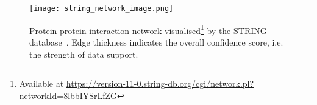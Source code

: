 \begin{figure}
    \texttt{[image: string\_network\_image.png]}
    \caption[Protein-protein interaction network visualised by the STRING database~\cite{Szklarczyk2019}.
    Edge thickness indicates the overall confidence score, i.e. the strength of data support.]%
    {Protein-protein interaction network visualised\footnote{Available at \url{https://version-11-0.string-db.org/cgi/network.pl?networkId=8lbbIYSrLfZG}} by the STRING database~\cite{Szklarczyk2019}.
    Edge thickness indicates the overall confidence score, i.e. the strength of data support.}
    \label{fig:string_network_image}
\end{figure}
